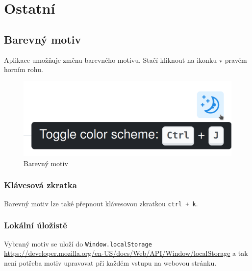 
\section{Ostatní}\label{sec:ostatni}

\subsection{Barevný motiv}\label{subsec:barevny-motiv}
Aplikace umožňuje změnu barevného motivu.
Stačí kliknout na ikonku v pravém horním rohu.

\begin{figure}
    \centering
    \includegraphics[scale=0.4]{assets/images/color-scheme}
    \caption{Barevný motiv}\label{fig:barevny-motiv}
\end{figure}

\subsubsection{Klávesová zkratka}
Barevný motiv lze také přepnout klávesovou zkratkou \texttt{ctrl + k}.

\subsubsection{Lokální úložistě}
Vybraný motiv se uloží do \texttt{Window.localStorage}
\url{https://developer.mozilla.org/en-US/docs/Web/API/Window/localStorage}
a tak není potřeba motiv upravovat při každém vstupu na webovou stránku.
